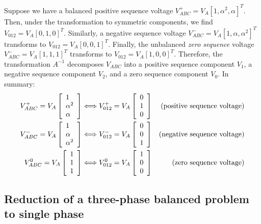 \documentclass[11pt]{article}
\begin{document}
Suppose we have a balanced positive sequence voltage $V^+_{ABC} = V_A[1, \alpha^2, \alpha]^T$. Then, under the transformation to symmetric components, we find $V_{012} = V_A[0, 1, 0]^T$. Similarly, a negative sequence voltage $V^-_{ABC} = V_A[1, \alpha, \alpha^2]^T$ transforms to $V_{012} = V_A[0, 0, 1]^T$. Finally, the unbalanced \emph{zero sequence} voltage $V^-_{ABC} = V_A[1, 1, 1]^T$ transforms to $V_{012} = V_A[1, 0, 0]^T$. Therefore, the transformation $A^{-1}$ decomposes $V_{ABC}$ into a positive sequence component $V_1$, a negative sequence component $V_2$, and a zero sequence component $V_0$. In summary:
\begin{align}
V_{ABC}^+ = V_A\left[\begin{array}{l} 
	1 \\ \alpha^2 \\ \alpha 
\end{array}\right] &\Longleftrightarrow 
V_{012}^+ = V_A\left[\begin{array}{l} 
	0 \\ 1 \\ 0
\end{array}\right] & \text{(positive sequence voltage)}\notag \\
V_{ABC}^- = V_A\left[\begin{array}{l} 
	1 \\ \alpha \\ \alpha^2
\end{array}\right] &\Longleftrightarrow 
V_{012}^- = V_A\left[\begin{array}{l} 
	0 \\ 0 \\ 1
\end{array}\right] & \text{(negative sequence voltage)}\notag \\
V_{ABC}^0 = V_A\left[\begin{array}{l} 
	1 \\ 1 \\ 1
\end{array}\right] &\Longleftrightarrow 
V_{012}^0 = V_A\left[\begin{array}{l} 
	1 \\ 0 \\ 0
\end{array}\right] & \text{(zero sequence voltage)}\notag \\
\end{align}

\subsection{Reduction of a three-phase balanced problem to single phase}
\end{document}
